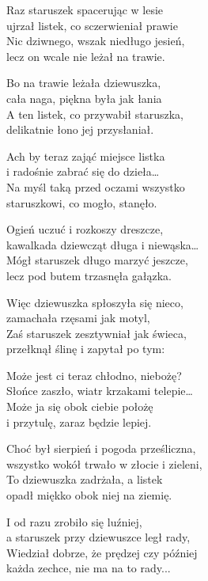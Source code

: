 \begin{text}
    Raz staruszek spacerując w lesie\\
    ujrzał listek, co sczerwieniał prawie\\
    Nic dziwnego, wszak niedługo jesień,\\
    lecz on wcale nie leżał na trawie.

    \vin Bo na trawie leżała dziewuszka,\\
    \vin cała naga, piękna była jak łania\\
    \vin A ten listek, co przywabił staruszka,\\
    \vin delikatnie łono jej przysłaniał.

    Ach by teraz zająć miejsce listka\\
    i radośnie zabrać się do dzieła…\\
    Na myśl taką przed oczami wszystko\\
    staruszkowi, co mogło, stanęło.

    \vin Ogień uczuć i rozkoszy dreszcze,\\
    \vin kawalkada dziewcząt długa i niewąska…\\
    \vin Mógł staruszek długo marzyć jeszcze,\\
    \vin lecz pod butem trzasnęła gałązka.

    Więc dziewuszka spłoszyła się nieco,\\
    zamachała rzęsami jak motyl,\\
    Zaś staruszek zesztywniał jak świeca,\\
    przełknął ślinę i zapytał po tym:

    \vin Może jest ci teraz chłodno, niebożę?\\
    \vin Słońce zaszło, wiatr krzakami telepie…\\
    \vin Może ja się obok ciebie położę\\
    \vin i przytulę, zaraz będzie lepiej.

    Choć był sierpień i pogoda prześliczna,\\
    wszystko wokół trwało w złocie i zieleni,\\
    To dziewuszka zadrżała, a listek\\
    opadł miękko obok niej na ziemię.

    \vin I od razu zrobiło się luźniej,\\
    \vin a staruszek przy dziewuszce legł rady,\\
    \vin Wiedział dobrze, że prędzej czy później\\
    \vin każda zechce, nie ma na to rady...  
\end{text}
